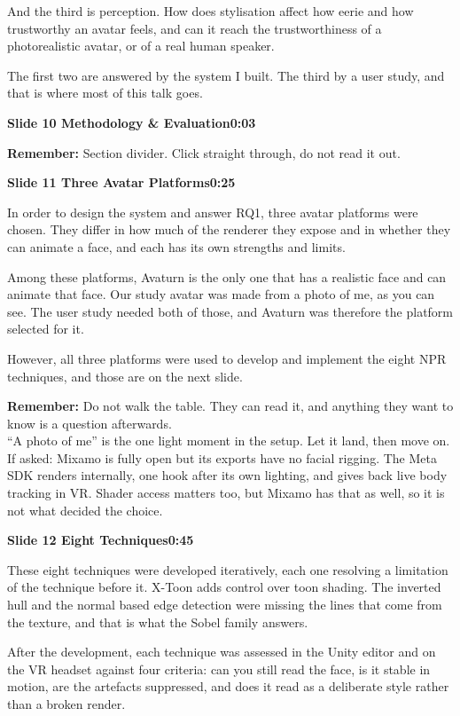 \documentclass[11pt,a4paper]{article}
\newcommand{\slidehead}[3]{%
  \needspace{5\baselineskip}
  \vspace{0.9em}
  \noindent\colorbox{knblue}{\parbox{0.978\textwidth}{\vspace{1pt}\color{white}\textbf{Slide #1 \quad #2}\hfill\textbf{#3}\vspace{1pt}}}
  \vspace{0.35em}\par}
\newcommand{\remind}[1]{%
  \vspace{0.15em}
  \noindent\colorbox{knlight}{\parbox{0.972\textwidth}{\small\color{knblue}\textbf{Remember:} #1}}
  \vspace{0.2em}\par}
\begin{document}
And the third is perception. How does stylisation affect how eerie and how trustworthy an avatar feels, and can it reach the trustworthiness of a photorealistic avatar, or of a real human speaker.

The first two are answered by the system I built. The third by a user study, and that is where most of this talk goes.

\slidehead{10}{Methodology \& Evaluation}{0:03}

\remind{Section divider. Click straight through, do not read it out.}

\slidehead{11}{Three Avatar Platforms}{0:25}

In order to design the system and answer RQ1, three avatar platforms were chosen. They differ in how much of the renderer they expose and in whether they can animate a face, and each has its own strengths and limits.

Among these platforms, Avaturn is the only one that has a realistic face and can animate that face. Our study avatar was made from a photo of me, as you can see. The user study needed both of those, and Avaturn was therefore the platform selected for it.

However, all three platforms were used to develop and implement the eight NPR techniques, and those are on the next slide.

\remind{Do not walk the table. They can read it, and anything they want to know is a question afterwards.\\[0.4em] ``A photo of me'' is the one light moment in the setup. Let it land, then move on.\\[0.4em] If asked: Mixamo is fully open but its exports have no facial rigging. The Meta SDK renders internally, one hook after its own lighting, and gives back live body tracking in VR. Shader access matters too, but Mixamo has that as well, so it is not what decided the choice.}

\slidehead{12}{Eight Techniques}{0:45}

These eight techniques were developed iteratively, each one resolving a limitation of the technique before it. X-Toon adds control over toon shading. The inverted hull and the normal based edge detection were missing the lines that come from the texture, and that is what the Sobel family answers.

After the development, each technique was assessed in the Unity editor and on the VR headset against four criteria: can you still read the face, is it stable in motion, are the artefacts suppressed, and does it read as a deliberate style rather than a broken render.
\end{document}

